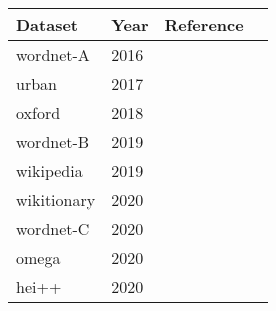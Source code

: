 \begin{tabular}{|l|l|l|l|}
    \hline
    Dataset     & Year & Reference                            \\
    \hline
    wordnet-A   & 2016 & \cite{noraset_definition_2016}       \\
    urban       & 2017 & \cite{ni_learning_2017}              \\
    oxford      & 2018 & \cite{gadetsky_conditional_2018}     \\
    wordnet-B   & 2019 & \cite{ishiwatari_learning_2019}      \\
    wikipedia   & 2019 & \cite{ishiwatari_learning_2019}      \\
    wikitionary & 2020 & \cite{kabiri_evaluating_2020}        \\
    wordnet-C   & 2020 & \cite{kabiri_evaluating_2020}        \\
    omega       & 2020 & \cite{kabiri_evaluating_2020}        \\
    hei++       & 2020 & \cite{bevilacqua_generationary_2020} \\
    \hline
\end{tabular}
